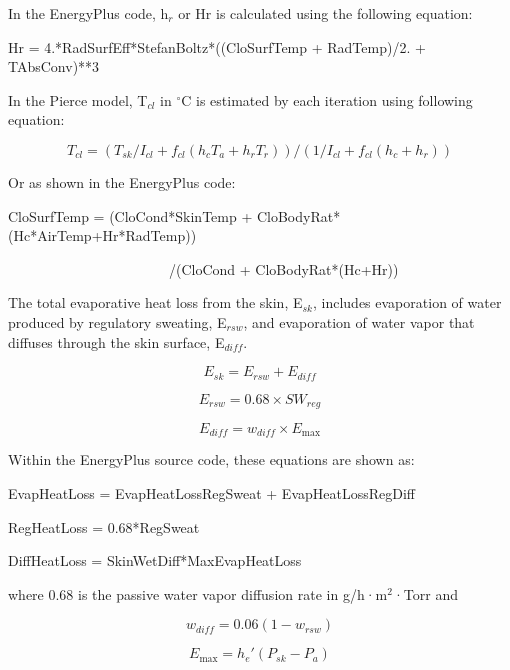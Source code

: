 In the EnergyPlus code, h\(_{r}\) or Hr is calculated using the following equation:

Hr = 4.*RadSurfEff*StefanBoltz*((CloSurfTemp + RadTemp)/2. + TAbsConv)**3

In the Pierce model, T\(_{cl}\) in $^{\circ}$C is estimated by each iteration using following equation:

\begin{equation}
{T_{cl}} = ({T_{sk}}/{I_{cl}} + {f_{cl}}({h_c}{T_a} + {h_r}{T_r}))/(1/{I_{cl}} + {f_{cl}}({h_c} + {h_r}))
\end{equation}

Or as shown in the EnergyPlus code:

CloSurfTemp = (CloCond*SkinTemp + CloBodyRat*(Hc*AirTemp+Hr*RadTemp))

~~~~~~~~~~~~~~~~~~~~~~~/(CloCond + CloBodyRat*(Hc+Hr))

The total evaporative heat loss from the skin, E\(_{sk}\), includes evaporation of water produced by regulatory sweating, E\(_{rsw}\), and evaporation of water vapor that diffuses through the skin surface, E\(_{diff}\).

\begin{equation}
{E_{sk}} = {E_{rsw}} + {E_{diff}}
\end{equation}

\begin{equation}
{E_{rsw}} = 0.68 \times S{W_{reg}}
\end{equation}

\begin{equation}
{E_{diff}} = {w_{diff}} \times {E_{\max }}
\end{equation}

Within the EnergyPlus source code, these equations are shown as:

EvapHeatLoss = EvapHeatLossRegSweat + EvapHeatLossRegDiff

RegHeatLoss = 0.68*RegSweat

DiffHeatLoss = SkinWetDiff*MaxEvapHeatLoss

where 0.68 is the passive water vapor diffusion rate in g/h·m\(^{2}\)·Torr and

\begin{equation}
{w_{diff}} = 0.06(1 - {w_{rsw}})
\end{equation}

\begin{equation}
{E_{\max }} = {h_e}'({P_{sk}} - {P_a})
\end{equation}

